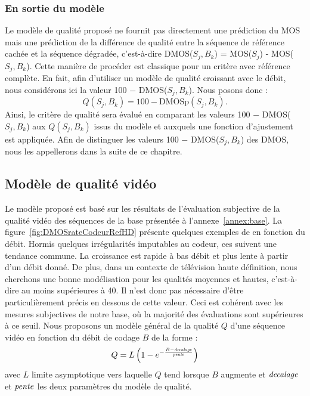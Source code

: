 \subsubsection{En sortie du modèle}
Le modèle de qualité proposé ne fournit pas directement une prédiction du MOS mais une prédiction de la différence de qualité entre la séquence de référence cachée et la séquence dégradée, c'est-à-dire DMOS($S_j,B_k$) = MOS($S_j$) - MOS($S_j,B_k$). Cette manière de procéder est classique pour un critère avec référence complète. En fait, afin d'utiliser un modèle de qualité croissant avec le débit, nous considérons ici la valeur 100 $-$ DMOS($S_j,B_k$). Nous posons donc :
\begin{equation}
Q(S_j,B_k) = \text{100} - \text{DMOSp}(S_j,B_k).
\end{equation}
%
Ainsi, le critère de qualité sera évalué en comparant les valeurs 100 $-$ DMOS($S_j,B_k$) aux $Q(S_j,B_k)$ issus du modèle et auxquels une fonction d'ajustement est appliquée. Afin de distinguer les valeurs 100 $-$ DMOS($S_j,B_k$) des DMOS, nous les appellerons \Dcent{} dans la suite de ce chapitre.


\subsection{Modèle de qualité vidéo}
Le modèle proposé est basé sur les résultats de l'évaluation subjective de la qualité vidéo des séquences de la base présentée à l'annexe~\ref{annex:base}. La figure~\ref{fig:DMOSrateCodeurRefHD} présente quelques exemples de \Dcent{} en fonction du débit. Hormis quelques irrégularités imputables au codeur, ces \Dcent{} suivent une tendance commune. La croissance est rapide à bas débit et plus lente à partir d'un débit donné. De plus, dans un contexte de télévision haute définition, nous cherchons une bonne modélisation pour les qualités moyennes et hautes, c'est-à-dire au moins supérieures à 40. Il n'est donc pas nécessaire d'être particulièrement précis en dessous de cette valeur. Ceci est cohérent avec les mesures subjectives de notre base, où la majorité des évaluations sont supérieures à ce seuil. Nous proposons un modèle général de la qualité $Q$ d'une séquence vidéo en fonction du débit de codage $B$ de la forme :
\begin{equation}
Q = L \left(1 - e^{-\frac{B - \mathit{decalage}}{\mathit{pente}}}\right)
\end{equation}
%
avec $L$ limite asymptotique vers laquelle $Q$ tend lorsque $B$ augmente et $\mathit{decalage}$ et $\mathit{pente}$ les deux paramètres du modèle de qualité.

